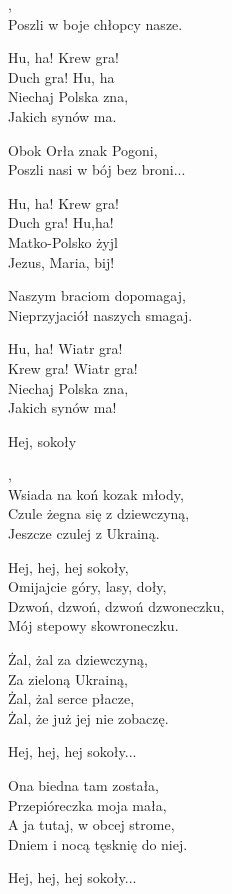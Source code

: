 \documentclass[12pt,a4paper,twoside]{songbook}
\begin{document}
\begin{lyrics}[longestline={W krwawym polu srebrne ptaszę,}]
,\\
Poszli w boje chłopcy nasze.

Hu, ha! Krew gra!\\
Duch gra! Hu, ha\\
Niechaj Polska zna,\\
Jakich synów ma.

Obok Orła znak Pogoni,\\
Poszli nasi w bój bez broni...

Hu, ha! Krew gra!\\
Duch gra! Hu,ha!\\
Matko-Polsko żyjl\\
Jezus, Maria, bij!

Naszym braciom dopomagaj,\\
Nieprzyjaciół naszych smagaj.

Hu, ha! Wiatr gra!\\
Krew gra! Wiatr gra!\\
Niechaj Polska zna,\\
Jakich synów ma!
\end{lyrics}


\song
{Hej, sokoły}
\begin{lyrics}[longestline={Hej, tam gdzieś znad czarnej wody,}]
,\\
Wsiada na koń kozak młody,\\
Czule żegna się z dziewczyną,\\
Jeszcze czulej z Ukrainą.

Hej, hej, hej sokoły,\\
Omijajcie góry, lasy, doły,\\
Dzwoń, dzwoń, dzwoń dzwoneczku,\\
Mój stepowy skowroneczku.

Żal, żal za dziewczyną,\\
Za zieloną Ukrainą,\\
Żal, żal serce płacze,\\
Żal, że już jej nie zobaczę.

Hej, hej, hej sokoły...

Ona biedna tam została,\\
Przepióreczka moja mała,\\
A ja tutaj, w obcej strome,\\
Dniem i nocą tęsknię do niej.

Hej, hej, hej sokoły...
\end{lyrics}




\end{document}
